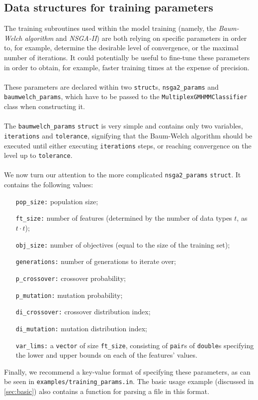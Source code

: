 \documentclass[12pt,openany]{article}
\begin{document}
	\subsection{Data structures for training parameters}\label{sec:trnparam}
	The training subroutines used within the model training (namely, the \emph{Baum-Welch algorithm} and \emph{NSGA-II}) are both relying on specific parameters in order to, for example, determine the desirable level of convergence, or the maximal number of iterations. It could potentially be useful to fine-tune these parameters in order to obtain, for example, faster training times at the expense of precision.\\ \\
	These parameters are declared within two {\tt struct}s, {\tt nsga2\_params} and {\tt baumwelch\_params}, which have to be passed to the {\tt MultiplexGMHMMClassifier} class when constructing it.\\ \\
	The {\tt baumwelch\_params} {\tt struct} is very simple and contains only two variables, {\tt iterations} and {\tt tolerance}, signifying that the Baum-Welch algorithm should be executed until either executing {\tt iterations} steps, or reaching convergence on the level up to {\tt tolerance}.\\ \\
	We now turn our attention to the more complicated {\tt nsga2\_params} {\tt struct}. It contains the following values:
	\begin{itemize}
		\item[\tt pop\_size:] population size;
		\item[\tt ft\_size:] number of features (determined by the number of data types $t$, as $t \cdot t$);
		\item[\tt obj\_size:] number of objectives (equal to the size of the training set);
		\item[\tt generations:] number of generations to iterate over;
		\item[\tt p\_crossover:] crossover probability;
		\item[\tt p\_mutation:] mutation probability;
		\item[\tt di\_crossover:] crossover distribution index;
		\item[\tt di\_mutation:] mutation distribution index;
		\item[\tt var\_lims:] a {\tt vector} of size {\tt ft\_size}, consisting of {\tt pair}s of {\tt double}s specifying the lower and upper bounds on each of the features' values.
	\end{itemize}
	Finally, we recommend a key-value format of specifying these parameters, as can be seen in {\tt examples/training\_params.in}. The basic usage example (discussed in \cref{sec:basic}) also contains a function for parsing a file in this format.
\end{document}

